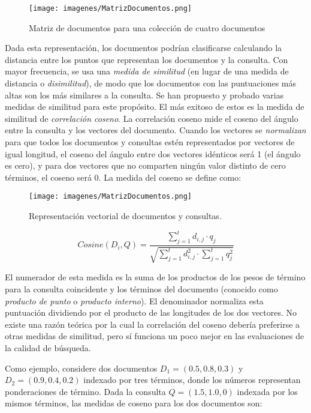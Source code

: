 \begin{figure}[h!]
	\centering
	\texttt{[image: imagenes/MatrizDocumentos.png]}
	\caption{\label{fig:MatrizDocumentos}Matriz de documentos para una colección de cuatro documentos}
\end{figure}

Dada esta representación, los documentos podrían clasificarse calculando la distancia entre los puntos que representan los documentos y la consulta. Con mayor frecuencia, se usa una \textit{medida de similitud} (en lugar de una medida de distancia o \textit{disimilitud}), de modo que los documentos con las puntuaciones más altas son los más similares a la consulta. Se han propuesto y probado varias medidas de similitud para este propósito. El más exitoso de estos es la medida de similitud de \textit{correlación coseno}. La correlación coseno mide el coseno del ángulo entre la consulta y los vectores del documento. Cuando los vectores se \textit{normalizan} para que todos los documentos y consultas estén representados por vectores de igual longitud, el coseno del ángulo entre dos vectores idénticos será 1 (el ángulo es cero), y para dos vectores que no comparten ningún valor distinto de cero términos, el coseno será 0. La medida del coseno se define como:


\begin{figure}[h!]
	\centering
	\texttt{[image: imagenes/MatrizDocumentos.png]}
	\caption{\label{fig:VectorRepresentacion}Representación vectorial de documentos y consultas.}
\end{figure}

$$Cosine(D_i,Q)=\dfrac{\sum_{j=1}^{t}d_{i,j}\cdot q_j}{\sqrt{\sum_{j=1}^{t}d_{i,j}^2\cdot \sum_{j=1}^{t}q_{j}^2}}$$

El numerador de esta medida es la suma de los productos de los pesos de término para la consulta coincidente y los términos del documento (conocido como \textit{producto de punto} o \textit{producto interno}). El denominador normaliza esta puntuación dividiendo por el producto de las longitudes de los dos vectores. No existe una razón teórica por la cual la correlación del coseno debería preferirse a otras medidas de similitud, pero sí funciona un poco mejor en las evaluaciones de la calidad de búsqueda.

Como ejemplo, considere dos documentos $D_1 = (0.5, 0.8, 0.3)$ y $D_2 =
(0.9, 0.4, 0.2)$ indexado por tres términos, donde los números representan ponderaciones de término. Dada la consulta $Q = (1.5, 1.0, 0)$ indexada por los mismos términos, las medidas de coseno para los dos documentos son:

